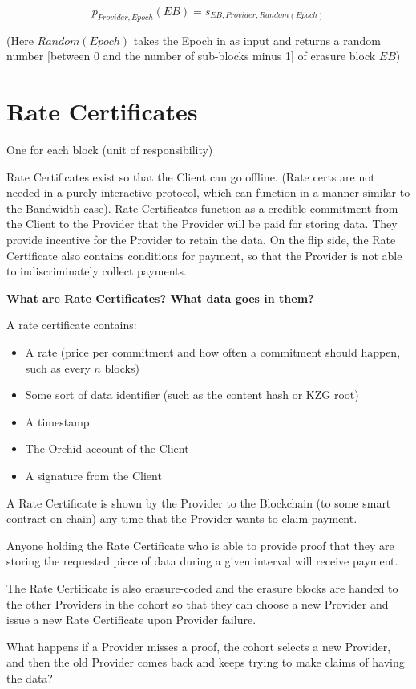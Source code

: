 \documentclass{article}
\begin{document}
$$p_{Provider,Epoch}(EB)=s_{EB,Provider,Random(Epoch)}$$

(Here $Random(Epoch)$ takes the Epoch in as input and returns a random number [between 0 and the number of sub-blocks minus 1] of erasure block $EB$)

\section{Rate Certificates} \label{Rate Certificates}
One for each block (unit of responsibility)

Rate Certificates exist so that the Client can go offline. (Rate certs are not needed in a purely interactive protocol, which can function in a manner similar to the Bandwidth case). Rate Certificates function as a credible commitment from the Client to the Provider that the Provider will be paid for storing data. They provide incentive for the Provider to retain the data. On the flip side, the Rate Certificate also contains conditions for payment, so that the Provider is not able to indiscriminately collect payments. 

\textbf{What are Rate Certificates? What data goes in them?}

A rate certificate contains: 
\begin{itemize}
    \item A rate (price per commitment and how often a commitment should happen, such as every $n$ blocks)
    \item Some sort of data identifier (such as the content hash or KZG root)
    \item A timestamp
    \item The Orchid account of the Client
    \item A signature from the Client
\end{itemize}


A Rate Certificate is shown by the Provider to the Blockchain (to some smart contract on-chain) any time that the Provider wants to claim payment. 

Anyone holding the Rate Certificate who is able to provide proof that they are storing the requested piece of data during a given interval will receive payment. 

The Rate Certificate is also erasure-coded and the erasure blocks are handed to the other Providers in the cohort so that they can choose a new Provider and issue a new Rate Certificate upon Provider failure.

What happens if a Provider misses a proof, the cohort selects a new Provider, and then the old Provider comes back and keeps trying to make claims of having the data?
\end{document}
